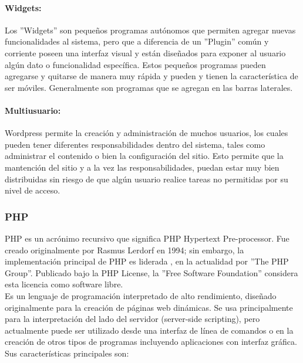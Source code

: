 \paragraph{Widgets:}
Los ''Widgets'' son pequeños programas autónomos que permiten agregar nuevas funcionalidades al sistema, pero que a diferencia de un ''Plugin'' común y corriente poseen una interfaz visual y están diseñados para exponer al usuario algún dato o funcionalidad específica. Estos pequeños programas pueden agregarse y quitarse de manera muy rápida y pueden y tienen la característica de ser móviles. Generalmente son programas que se agregan en las barras laterales.

\paragraph{Multiusuario:}
Wordpress permite la creación y administración de muchos usuarios, los cuales pueden tener diferentes responsabilidades dentro del sistema, tales como administrar el contenido o bien la configuración del sitio. Esto permite que la mantención del sitio y a la vez las responsabilidades, puedan estar muy bien distribuidas sin riesgo de que algún usuario realice tareas no permitidas por su nivel de acceso.

\subsubsection{PHP}
PHP es un acrónimo recursivo que significa PHP Hypertext Pre-processor. Fue creado originalmente por Rasmus Lerdorf en 1994; sin embargo, la implementación principal de PHP es liderada , en la actualidad por ''The PHP Group\cite{php:1}''. Publicado bajo la PHP License, la ''Free Software Foundation'' considera esta licencia como software libre.\\

Es un lenguaje de programación interpretado de alto rendimiento, diseñado originalmente para la creación de páginas web dinámicas. Se usa principalmente para la interpretación del lado del servidor (server-side scripting), pero actualmente puede ser utilizado desde una interfaz de línea de comandos o en la creación de otros tipos de programas incluyendo aplicaciones con interfaz gráfica. Sus características principales son:


